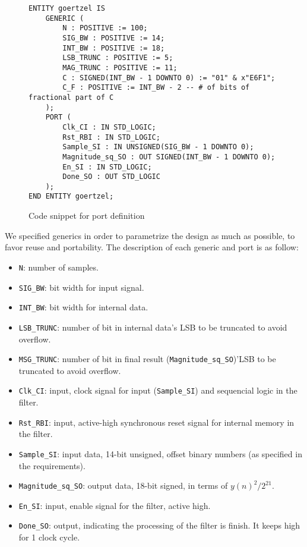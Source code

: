 \lstset{language=VHDL}
\begin{figure}[H]\begin{lstlisting}
ENTITY goertzel IS
    GENERIC (
        N : POSITIVE := 100;
        SIG_BW : POSITIVE := 14;
        INT_BW : POSITIVE := 18;
        LSB_TRUNC : POSITIVE := 5;
        MAG_TRUNC : POSITIVE := 11;
        C : SIGNED(INT_BW - 1 DOWNTO 0) := "01" & x"E6F1";
        C_F : POSITIVE := INT_BW - 2 -- # of bits of fractional part of C
    );
    PORT (
        Clk_CI : IN STD_LOGIC;
        Rst_RBI : IN STD_LOGIC;
        Sample_SI : IN UNSIGNED(SIG_BW - 1 DOWNTO 0);
        Magnitude_sq_SO : OUT SIGNED(INT_BW - 1 DOWNTO 0);
        En_SI : IN STD_LOGIC;
        Done_SO : OUT STD_LOGIC
    );
END ENTITY goertzel;
\end{lstlisting}
\caption{Code snippet for port definition}
\label{fig:vhdl_ports}
\end{figure}

We specified generics in order to parametrize the design as much as possible, to favor reuse and portability. The description of each generic and port is as follow:
\begin{itemize}
    \item \texttt{N}: number of samples.
    \item \texttt{SIG\_BW}: bit width for input signal.
    \item \texttt{INT\_BW}: bit width for internal data.
    \item \texttt{LSB\_TRUNC}: number of bit in internal data's LSB to be truncated to avoid overflow.
    \item \texttt{MSG\_TRUNC}: number of bit in final result (\texttt{Magnitude\_sq\_SO})'LSB to be truncated to avoid overflow.
    \item \texttt{Clk\_CI}: input, clock signal for input (\texttt{Sample\_SI}) and sequencial logic in the filter.
    \item \texttt{Rst\_RBI}: input, active-high synchronous reset signal for internal memory in the filter.
    \item \texttt{Sample\_SI}: input data, 14-bit unsigned, offset binary numbers (as specified in the requirements).
    \item \texttt{Magnitude\_sq\_SO}: output data, 18-bit signed, in terms of $y(n)^2 / 2^{21}$.
    \item \texttt{En\_SI}: input, enable signal for the filter, active high.
    \item \texttt{Done\_SO}: output, indicating the processing of the filter is finish. It keeps high for 1 clock cycle.
\end{itemize}

